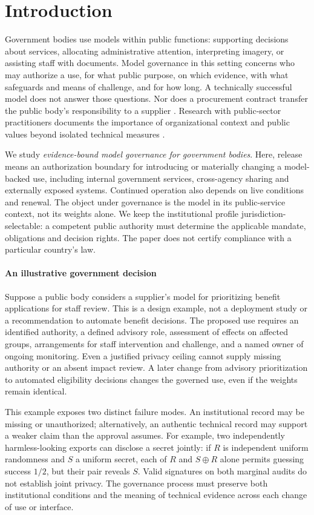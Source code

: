 \documentclass[conference,compsoc]{IEEEtran}
\begin{document}
\section{Introduction}
Government bodies use models within public functions: supporting decisions
about services, allocating administrative attention, interpreting imagery,
or assisting staff with documents. Model governance in this setting concerns
who may authorize a use, for what public purpose, on which evidence, with
what safeguards and means of challenge, and for how long. A technically
successful model does not answer those questions. Nor does a procurement
contract transfer the public body's responsibility to a supplier
\citep{ukAIPlaybook}. Research with public-sector practitioners documents
the importance of organizational context and public values beyond isolated
technical measures \citep{veale2018publicsector}.

We study \emph{evidence-bound model governance for government bodies}.
Here, release means an authorization boundary for introducing or materially
changing a model-backed use, including internal government services,
cross-agency sharing and externally exposed systems. Continued operation
also depends on live conditions and renewal. The object under governance is
the model in its public-service context, not its weights alone. We keep the
institutional profile jurisdiction-selectable: a competent public authority
must determine the applicable mandate, obligations and decision rights.
The paper does not certify compliance with a particular country's law.

\paragraph{An illustrative government decision}
\label{sec:gov-context}
Suppose a public body considers a supplier's model for prioritizing benefit
applications for staff review. This is a design example, not a deployment
study or a recommendation to automate benefit decisions. The proposed use
requires an identified authority, a defined advisory role, assessment of
effects on affected groups, arrangements for staff intervention and
challenge, and a named owner of ongoing monitoring. Even a justified privacy
ceiling cannot supply missing authority or an absent impact review.
A later change from advisory prioritization to automated eligibility
decisions changes the governed use, even if the weights remain identical.

This example exposes two distinct failure modes. An institutional record
may be missing or unauthorized; alternatively, an authentic technical
record may support a weaker claim than the approval assumes. For example,
two independently harmless-looking exports can disclose a secret jointly:
if $R$ is independent uniform randomness and $S$ a uniform secret, each of
$R$ and $S\oplus R$ alone permits guessing success $1/2$, but their pair
reveals $S$. Valid signatures on both marginal audits do not establish joint
privacy. The governance process must preserve both institutional conditions
and the meaning of technical evidence across each change of use or interface.
\end{document}
